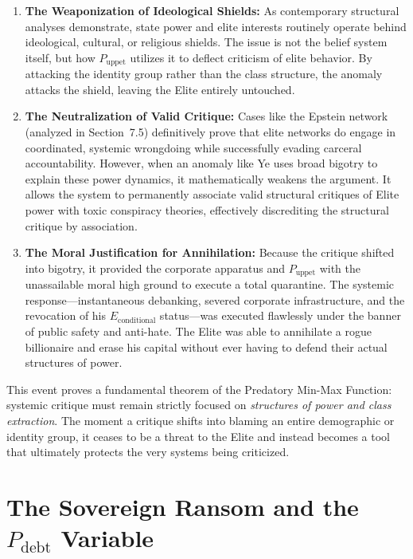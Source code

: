 \documentclass[12pt,openany]{book}
\begin{document}
\begin{enumerate}
    \item \textbf{The Weaponization of Ideological Shields:} As contemporary structural analyses demonstrate, state power and elite interests routinely operate behind ideological, cultural, or religious shields. The issue is not the belief system itself, but how $P_{\text{uppet}}$ utilizes it to deflect criticism of elite behavior. By attacking the identity group rather than the class structure, the anomaly attacks the shield, leaving the Elite entirely untouched.

    \item \textbf{The Neutralization of Valid Critique:} Cases like the Epstein network (analyzed in Section~7.5) definitively prove that elite networks do engage in coordinated, systemic wrongdoing while successfully evading carceral accountability. However, when an anomaly like Ye uses broad bigotry to explain these power dynamics, it mathematically weakens the argument. It allows the system to permanently associate valid structural critiques of Elite power with toxic conspiracy theories, effectively discrediting the structural critique by association.

    \item \textbf{The Moral Justification for Annihilation:} Because the critique shifted into bigotry, it provided the corporate apparatus and $P_{\text{uppet}}$ with the unassailable moral high ground to execute a total quarantine. The systemic response---instantaneous debanking, severed corporate infrastructure, and the revocation of his $E_{\text{conditional}}$ status---was executed flawlessly under the banner of public safety and anti-hate. The Elite was able to annihilate a rogue billionaire and erase his capital without ever having to defend their actual structures of power.
\end{enumerate}

This event proves a fundamental theorem of the Predatory Min-Max Function: systemic critique must remain strictly focused on \textit{structures of power and class extraction}. The moment a critique shifts into blaming an entire demographic or identity group, it ceases to be a threat to the Elite and instead becomes a tool that ultimately protects the very systems being criticized.

\section{The Sovereign Ransom and the \texorpdfstring{$P_{\text{debt}}$}{P\_debt} Variable}
\end{document}
